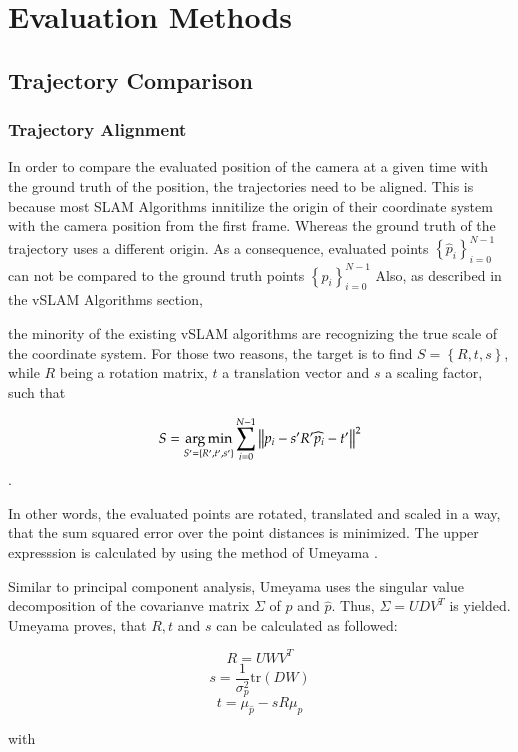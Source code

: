 \chapter{Evaluation Methods}

\section{Trajectory Comparison}

	\subsection{Trajectory Alignment}
	
	In order to compare the evaluated position of the camera at a given time with the ground truth of the 
	position, the trajectories need to be aligned. This is because most SLAM Algorithms innitilize the origin
	of their coordinate system with the camera position from the first frame. Whereas the ground truth of the 
	trajectory uses a different origin. As a consequence, evaluated points $ \left\{{\widehat{p}_i}\right\}_{i=0}^{N-1} $ can not be 
	compared to the ground truth points $ \left\{{p_i}\right\}_{i=0}^{N-1} $
	Also, as described in the vSLAM Algorithms section,
	
	
	the minority of the existing vSLAM algorithms are recognizing the true scale of the coordinate system. For
	those two reasons, the target is to find $S = \left\{R,t,s\right\}$, while $R$ being a rotation matrix, $t$ a translation vector
	and $s$ a scaling factor, 
	such that
	
	$$ S = \mathop{\mathrm{arg\,min}}_{S' = \left\{R', t', s' \right\}} \sum_{i = 0}^{N-1} \left\lVert p_i - s'R'\widehat{p}_i - t'\right\rVert^2 $$ .
	
	In other words, the evaluated points are rotated, translated and scaled in a way, that the sum squared error over the point
	distances is minimized. The upper expresssion is calculated by using the method of Umeyama \cite{ume}. 
	
	Similar to principal component analysis, Umeyama uses the singular value decomposition of the covarianve 
	matrix $\Sigma$ of $p$ and $\widehat{p}$. Thus, 
	$\Sigma = UDV^T$ is yielded. Umeyama proves, that $R,t$ and $s$ can be calculated as followed: 
	
	$$ R = UWV^T $$
	$$ s = \frac{1}{\sigma^2_p}\text{tr}\left(DW\right)$$
	$$ t = \mu_{\widehat{p}} - sR\mu_p $$
	
	with 
	
